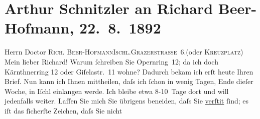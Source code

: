 

         
         \renewcommand{\erwaehntePersonen}{Personen: Richard Beer-Hofmann, Paul Goldmann}
         \renewcommand{\erwaehnteOrte}{Orte: Bad Ischl, Bösendorferstraße, Grazer Straße, Kreuzplatz, Kärntnerring, Opernring, San Sebastian, Wien}
         \renewcommand{\erwaehnteWerke}{Werke: Frankfurter Zeitung, Spanisches Strandleben}
               \section[Arthur Schnitzler an Richard Beer-Hofmann, 22. 8. 1892]{ Arthur Schnitzler an Richard Beer-Hofmann, 22. 8. 1892}\nopagebreak{}\rehead{ }\begin{ledgroupsized}[t]{13cm}\normalsize\beginnumbering \toendnotes[C]{\smallbreak\pagebreak[2]} 
\toendnotes[C]{\smallbreak}\pstart{}{\pb}Herrn Doctor \textsc{Rich.
                     Beer-Hofmann}\pend{}\pstart{}\textsc{Ischl.}\pend{}\pstart{}\textsc{Grazerstraße 6}.\pend{}\pstart{}(oder \textsc{Kreuzplatz})\pend{}{\bigskip}\pstart
           \noindent{}{\pb}Mein lieber Richard! Warum ſchreiben Sie Opernring 12; da ich doch Kärnthnerring 12 oder Giſelastr. 11
               wohne? Dadurch bekam ich erſt heute Ihren Brief. Nun kann ich Ihnen mittheilen, daſs
               ich ſchon in wenig Tagen, Ende dieſer Woche, in Iſchl einlangen werde. Ich bleibe etwa 8-10 Tage dort und will jedenfalls
               weiter. Laſſen Sie mich Sie übrigens beneiden, {\pb}daſs
               Sie \uline{verſti{\geminationm}t}{ }ſind; es iſt das ſicherſte Zeichen, daſs Sie nicht

\end{ledgroupsized}
